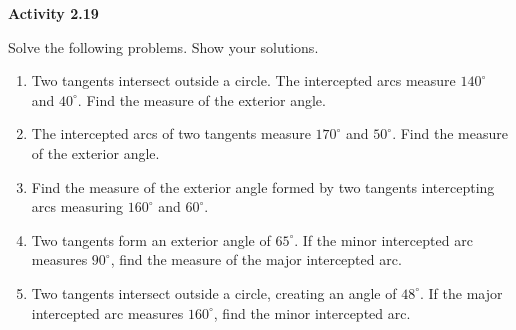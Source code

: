 \vspace{0.3ex}
\noindent\textbf{Activity 2.19}

\vspace{0.2ex}

Solve the following problems. Show your solutions.

\begin{enumerate}
    \item Two tangents intersect outside a circle. The intercepted arcs measure $140^\circ$ and $40^\circ$. Find the measure of the exterior angle.
    \item The intercepted arcs of two tangents measure $170^\circ$ and $50^\circ$. Find the measure of the exterior angle.
    \item Find the measure of the exterior angle formed by two tangents intercepting arcs measuring $160^\circ$ and $60^\circ$.
    \item Two tangents form an exterior angle of $65^\circ$. If the minor intercepted arc measures $90^\circ$, find the measure of the major intercepted arc.
    \item Two tangents intersect outside a circle, creating an angle of $48^\circ$. If the major intercepted arc measures $160^\circ$, find the minor intercepted arc.
\end{enumerate}
